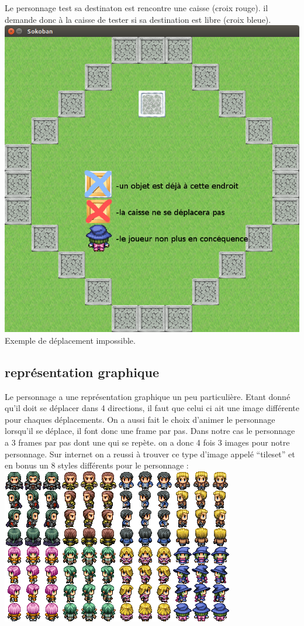 \documentclass{article}
\begin{document}
	\newline
	Le personnage test sa destinaton est rencontre une caisse (croix rouge). il demande donc à la caisse de tester si sa destination est libre 
	(croix bleue).
	\includegraphics[scale=0.25]{04.png}
	\newline
	Exemple de déplacement impossible.
	\subsection{représentation graphique}
	Le personnage a une représentation graphique un peu particulière. Etant donné qu'il doit se déplacer dans 4 directions, il faut que celui ci ait une image 
	différente pour chaques déplacements. On a aussi fait le choix d'animer le personnage lorsqu'il se déplace, il font donc une frame par pas. Dans notre cas 
	le personnage a 3 frames par pas dont une qui se repète. on a donc 4 fois 3 images pour notre personnage.
	\newline
	Sur internet on a reussi à trouver ce type d'image appelé ``tileset'' et en bonus un 8 styles différents pour le personnage :
	\newline
	\includegraphics[scale=0.25]{08.png}
\vspace{1cm}
\end{document}
